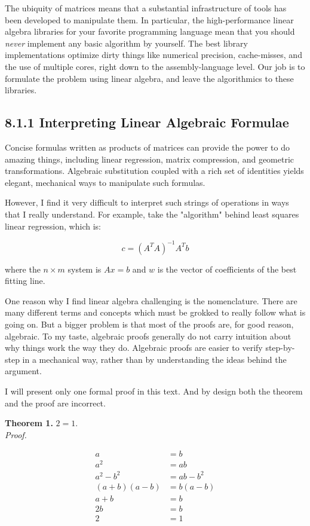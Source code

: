 \documentclass[10pt]{article}
\begin{document}
The ubiquity of matrices means that a substantial infrastructure of tools has been developed to manipulate them. In particular, the high-performance linear algebra libraries for your favorite programming language mean that you should \textit{never} implement any basic algorithm by yourself. The best library implementations optimize dirty things like numerical precision, cache-misses, and the use of multiple cores, right down to the assembly-language level. Our job is to formulate the problem using linear algebra, and leave the algorithmics to these libraries.

\subsection*{8.1.1 Interpreting Linear Algebraic Formulae}
Concise formulas written as products of matrices can provide the power to do amazing things, including linear regression, matrix compression, and geometric transformations. Algebraic substitution coupled with a rich set of identities yields elegant, mechanical ways to manipulate such formulas.

However, I find it very difficult to interpret such strings of operations in ways that I really understand. For example, take the "algorithm" behind least squares linear regression, which is:

\[ c = \left(A^T A\right)^{-1} A^T b \]

where the $n \times m$ system is $Ax = b$ and $w$ is the vector of coefficients of the best fitting line.

One reason why I find linear algebra challenging is the nomenclature. There are many different terms and concepts which must be grokked to really follow what is going on. But a bigger problem is that most of the proofs are, for good reason, algebraic. To my taste, algebraic proofs generally do not carry intuition about why things work the way they do. Algebraic proofs are easier to verify step-by-step in a mechanical way, rather than by understanding the ideas behind the argument.

I will present only one formal proof in this text. And by design both the theorem and the proof are incorrect.

\textbf{Theorem 1.} $2=1$.\\
\textit{Proof.}

\[
\begin{aligned}
a & = b \\
a^2 & = ab \\
a^2 - b^2 & = ab - b^2 \\
(a + b)(a - b) & = b(a - b) \\
a + b & = b \\
2b & = b \\
2 & = 1
\end{aligned}
\]
\end{document}
